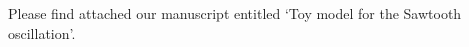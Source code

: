 \documentclass[12pt,stdletter,noaddrto, orderfromtodate,sigleft]{newlfm}
\begin{document}
\begin{newlfm}
Please find attached our manuscript entitled `Toy model for the Sawtooth oscillation'.

\end{newlfm}
\end{document}
